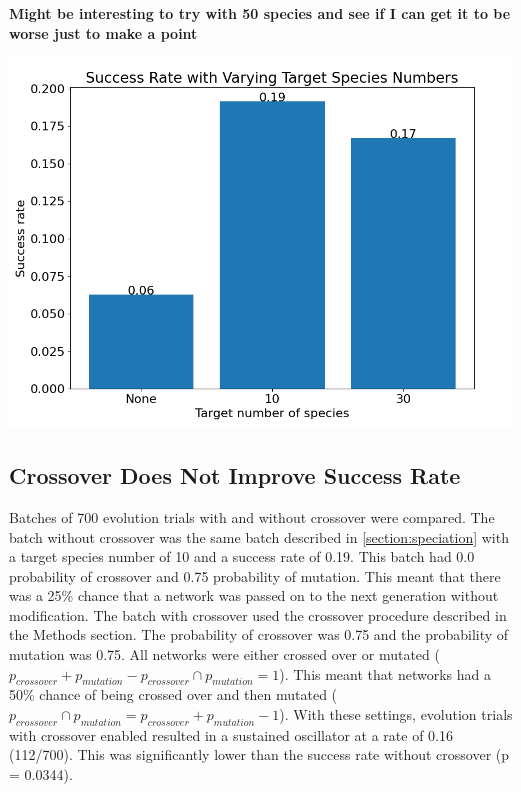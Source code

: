 \documentclass[12pt]{report}
\begin{document}
\textbf{Might be interesting to try with 50 species and see if I can get it to be worse just to make a point}
 
\begin{center}
    \includegraphics[width=15cm]{images/species_success_rate.png}
    \label{fig:species_success_rate}
\end{center}

\subsection{Crossover Does Not Improve Success Rate}
Batches of 700 evolution trials with and without crossover were compared. The batch without crossover was the same batch described in \ref{section:speciation} with a target species number of 10 and a success rate of 0.19. This batch had 0.0 probability of crossover and 0.75 probability of mutation. This meant that there was a 25\% chance that a network was passed on to the next generation without modification. The batch with crossover used the crossover procedure described in the Methods section. The probability of crossover was 0.75 and the probability of mutation was 0.75. All networks were either crossed over or mutated ($p_{crossover} + p_{mutation} - p_{crossover} \cap p_{mutation} = 1$). This meant that networks had a 50\% chance of being crossed over and then mutated ($p_{crossover} \cap p_{mutation} = p_{crossover} + p_{mutation} -1$). With these settings, evolution trials with crossover enabled resulted in a sustained oscillator at a rate of 0.16 (112/700). This was significantly lower than the success rate without crossover (p = 0.0344).
\end{document}
